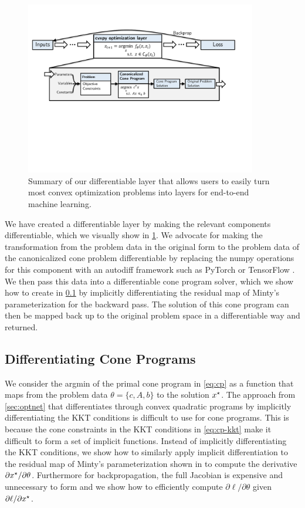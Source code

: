 \begin{figure}[t]
  \centering
  \includegraphics[width=0.9\textwidth]{overview.pdf}
  \caption{
    Summary of our differentiable \cvxpy layer that allows
    users to easily turn most convex optimization problems into
    layers for end-to-end machine learning.
  }
  \label{fig:overview}
\end{figure}

We have created a differentiable \cvxpy layer
by making the relevant components differentiable,
which we visually show in \cref{fig:overview}.
We advocate for making the transformation from the
problem data in the original form to the problem data of
the canonicalized cone problem differentiable
by replacing the numpy operations for this component
with an autodiff framework such as PyTorch \citep{paszke2017automatic}
or TensorFlow \citep{abadi2016tensorflow}.
We then pass this data into a differentiable cone program
solver, which we show how to create in \cref{sec:diff-cp}
by implicitly differentiating the residual map of
Minty's parameterization for the backward pass.
The solution of this cone program can then be mapped
back up to the original problem space in a differentiable
way and returned.

\subsection{Differentiating Cone Programs}
\label{sec:diff-cp}
We consider the argmin of the primal cone program
in \cref{eq:cp} as a function that maps from the
problem data $\theta = \{c, A, b\}$ to the solution ${x^\star}$.
The approach from \cref{sec:optnet}
that differentiates through convex quadratic programs by
implicitly differentiating the KKT conditions
is difficult to use for cone programs.
This is because the cone constraints in the KKT conditions
in \cref{eq:cp-kkt} make it difficult to form a
set of implicit functions.
Instead of implicitly differentiating the KKT conditions,
we show how to similarly apply implicit
differentiation to the residual map of
Minty's parameterization shown in \citet{busseti2018solution}
to compute the derivative
$\partial {x^\star}/\partial \theta$.
Furthermore for backpropagation, the full Jacobian is
expensive and unnecessary to form and we show how to
efficiently compute $\partial \ell/\partial \theta$
given $\partial \ell/\partial {x^\star}$.

